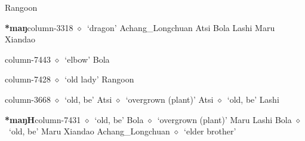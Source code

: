          Rangoon 
  \item {\footnotesize \textbf{*maŋ}}{\tiny column-3318}
         $\diamond$~`dragon'
         Achang\_Longchuan 
\hspace{1ex}
         Atsi 
\hspace{1ex}
         Bola 
\hspace{1ex}
         Lashi 
\hspace{1ex}
         Maru 
\hspace{1ex}
         Xiandao 
  \item {\footnotesize \textbf{}}{\tiny column-7443}
         $\diamond$~`elbow'
         Bola 
  \item {\footnotesize \textbf{}}{\tiny column-7428}
         $\diamond$~`old lady'
         Rangoon 
  \item {\footnotesize \textbf{}}{\tiny column-3668}
         $\diamond$~`old, be'
         Atsi 
\hspace{1ex}
         $\diamond$~`overgrown (plant)'
         Atsi 
\hspace{1ex}
         $\diamond$~`old, be'
         Lashi 
  \item {\footnotesize \textbf{*maŋH}}{\tiny column-7431}
         $\diamond$~`old, be'
         Bola 
\hspace{1ex}
         $\diamond$~`overgrown (plant)'
         Maru 
\hspace{1ex}
         Lashi 
\hspace{1ex}
         Bola 
\hspace{1ex}
         $\diamond$~`old, be'
         Maru 
\hspace{1ex}
         Xiandao 
\hspace{1ex}
         Achang\_Longchuan 
\hspace{1ex}
         $\diamond$~`elder brother'
